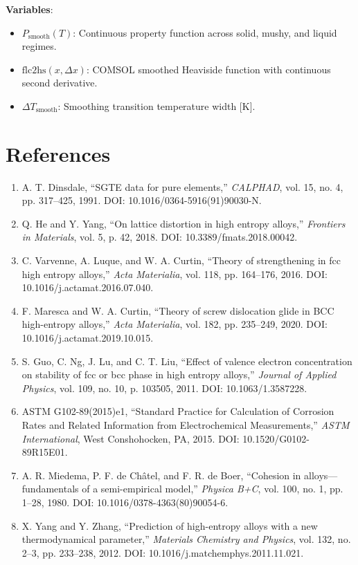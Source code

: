 \documentclass[11pt,a4paper]{article}
\begin{document}
\noindent\textbf{Variables}:
\begin{itemize}
  \item $P_{\text{smooth}}(T)$: Continuous property function across solid, mushy, and liquid regimes.
  \item $\text{flc2hs}(x, \Delta x)$: COMSOL smoothed Heaviside function with continuous second derivative.
  \item $\Delta T_{\text{smooth}}$: Smoothing transition temperature width [$\text{K}$].
\end{itemize}

\section*{References}
\begin{enumerate}
  \item A. T. Dinsdale, ``SGTE data for pure elements,'' \textit{CALPHAD}, vol. 15, no. 4, pp. 317--425, 1991. DOI: 10.1016/0364-5916(91)90030-N.
  \item Q. He and Y. Yang, ``On lattice distortion in high entropy alloys,'' \textit{Frontiers in Materials}, vol. 5, p. 42, 2018. DOI: 10.3389/fmats.2018.00042.
  \item C. Varvenne, A. Luque, and W. A. Curtin, ``Theory of strengthening in fcc high entropy alloys,'' \textit{Acta Materialia}, vol. 118, pp. 164--176, 2016. DOI: 10.1016/j.actamat.2016.07.040.
  \item F. Maresca and W. A. Curtin, ``Theory of screw dislocation glide in BCC high-entropy alloys,'' \textit{Acta Materialia}, vol. 182, pp. 235--249, 2020. DOI: 10.1016/j.actamat.2019.10.015.
  \item S. Guo, C. Ng, J. Lu, and C. T. Liu, ``Effect of valence electron concentration on stability of fcc or bcc phase in high entropy alloys,'' \textit{Journal of Applied Physics}, vol. 109, no. 10, p. 103505, 2011. DOI: 10.1063/1.3587228.
  \item ASTM G102-89(2015)e1, ``Standard Practice for Calculation of Corrosion Rates and Related Information from Electrochemical Measurements,'' \textit{ASTM International}, West Conshohocken, PA, 2015. DOI: 10.1520/G0102-89R15E01.
  \item A. R. Miedema, P. F. de Ch{\^a}tel, and F. R. de Boer, ``Cohesion in alloys---fundamentals of a semi-empirical model,'' \textit{Physica B+C}, vol. 100, no. 1, pp. 1--28, 1980. DOI: 10.1016/0378-4363(80)90054-6.
  \item X. Yang and Y. Zhang, ``Prediction of high-entropy alloys with a new thermodynamical parameter,'' \textit{Materials Chemistry and Physics}, vol. 132, no. 2--3, pp. 233--238, 2012. DOI: 10.1016/j.matchemphys.2011.11.021.

\end{enumerate}
\end{document}
